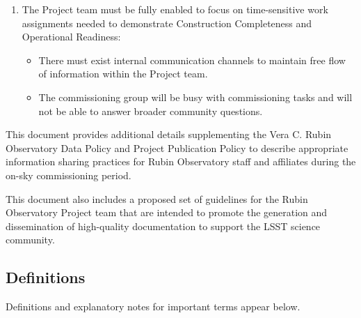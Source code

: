 \documentclass[SE,authoryear,toc,lsstdraft]{lsstdoc}
\begin{document}
\begin{enumerate}
  \item The Project team must be fully enabled to focus on time-sensitive work assignments needed to demonstrate Construction Completeness and Operational Readiness:

  \begin{itemize}

    \item There must exist internal communication channels to maintain free flow of information within the Project team.

    \item The commissioning group will be busy with commissioning tasks and will not be able to answer broader community questions.

  \end{itemize}

\end{enumerate}

This document provides additional details supplementing the Vera C. Rubin Observatory Data Policy  and Project Publication Policy  to describe appropriate information sharing practices for Rubin Observatory staff and affiliates during the on-sky commissioning period.

This document also includes a proposed set of guidelines for the Rubin Observatory Project team that are intended to promote the generation and dissemination of high-quality documentation to support the LSST science community.

\subsection{Definitions}
\label{definitions}

Definitions and explanatory notes for important terms appear below.
\end{document}
